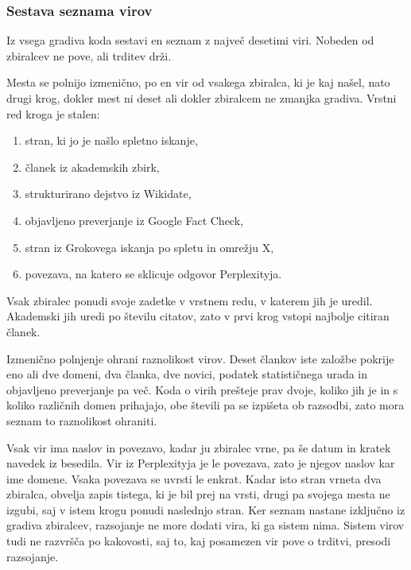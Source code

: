 \documentclass[a4paper, 12pt]{book}
\begin{document}
\subsubsection{Sestava seznama virov}
\label{ssec:viri}

Iz vsega gradiva koda sestavi en seznam z največ desetimi viri. Nobeden od zbiralcev ne pove, ali trditev drži.

Mesta se polnijo izmenično, po en vir od vsakega zbiralca, ki je kaj našel, nato drugi krog, dokler mest ni deset ali dokler zbiralcem ne zmanjka gradiva. Vrstni red kroga je stalen:

\begin{enumerate}\itemsep2pt
\item stran, ki jo je našlo spletno iskanje,
\item članek iz akademskih zbirk,
\item strukturirano dejstvo iz Wikidate,
\item objavljeno preverjanje iz Google Fact Check,
\item stran iz Grokovega iskanja po spletu in omrežju X,
\item povezava, na katero se sklicuje odgovor Perplexityja.
\end{enumerate}

Vsak zbiralec ponudi svoje zadetke v vrstnem redu, v katerem jih je uredil. Akademski jih uredi po številu citatov, zato v prvi krog vstopi najbolje citiran članek.

Izmenično polnjenje ohrani raznolikost virov. Deset člankov iste založbe pokrije eno ali dve domeni, dva članka, dve novici, podatek statističnega urada in objavljeno preverjanje pa več. Koda o virih prešteje prav dvoje, koliko jih je in s koliko različnih domen prihajajo, obe števili pa se izpišeta ob razsodbi, zato mora seznam to raznolikost ohraniti.

Vsak vir ima naslov in povezavo, kadar ju zbiralec vrne, pa še datum in kratek navedek iz besedila. Vir iz Perplexityja je le povezava, zato je njegov naslov kar ime domene. Vsaka povezava se uvrsti le enkrat. Kadar isto stran vrneta dva zbiralca, obvelja zapis tistega, ki je bil prej na vrsti, drugi pa svojega mesta ne izgubi, saj v istem krogu ponudi naslednjo stran. Ker seznam nastane izključno iz gradiva zbiralcev, razsojanje ne more dodati vira, ki ga sistem nima. Sistem virov tudi ne razvršča po kakovosti, saj to, kaj posamezen vir pove o trditvi, presodi razsojanje.

\label{ssec:neodvisnost}
\end{document}
